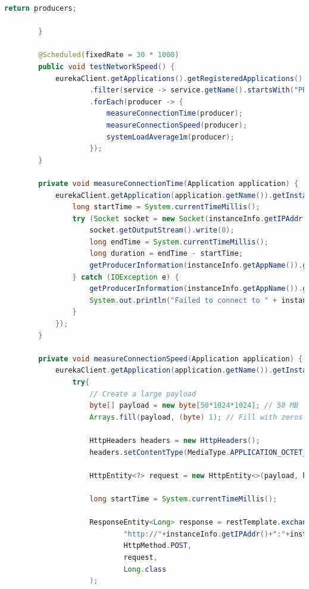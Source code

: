 \begin{lstlisting}[language=Java, caption=Kod usługi ProducerInfoService,label=ProducerInfoServiceCode]
            return producers;
    
        }
    
        @Scheduled(fixedRate = 30 * 1000)
        public void testNetworkSpeed() {
            eurekaClient.getApplications().getRegisteredApplications().stream()
                    .filter(service -> service.getName().startsWith("PRODUCER-"))
                    .forEach(producer -> {
                        measureConnectionTime(producer);
                        measureConnectionSpeed(producer);
                        systemLoadAverage1m(producer);
                    });
        }
    
        private void measureConnectionTime(Application application) {
            eurekaClient.getApplication(application.getName()).getInstances().forEach(instanceInfo -> {
                long startTime = System.currentTimeMillis();
                try (Socket socket = new Socket(instanceInfo.getIPAddr(), instanceInfo.getPort())) {
                    socket.getOutputStream().write(0);
                    long endTime = System.currentTimeMillis();
                    long duration = endTime - startTime;
                    getProducerInformation(instanceInfo.getAppName()).getMeasurementBufferConnectionTime().addMeasurement(duration+1);
                } catch (IOException e) {
                    getProducerInformation(instanceInfo.getAppName()).getMeasurementBufferConnectionTime().addMeasurement(Double.MAX_VALUE);
                    System.out.println("Failed to connect to " + instanceInfo.getIPAddr() + ":" + instanceInfo.getPort() + "->  " + e.getMessage());
                }
            });
        }
    
        private void measureConnectionSpeed(Application application) {
            eurekaClient.getApplication(application.getName()).getInstances().forEach(instanceInfo -> {
                try{
                    // Create a large payload
                    byte[] payload = new byte[50*1024*1024]; // 50 MB
                    Arrays.fill(payload, (byte) 1); // Fill with zeros
    
                    HttpHeaders headers = new HttpHeaders();
                    headers.setContentType(MediaType.APPLICATION_OCTET_STREAM);
    
                    HttpEntity<?> request = new HttpEntity<>(payload, headers);
    
                    long startTime = System.currentTimeMillis();
    
                    ResponseEntity<Long> response = restTemplate.exchange(
                            "http://"+instanceInfo.getIPAddr()+":"+instanceInfo.getPort()+"/connectionSpeed",
                            HttpMethod.POST,
                            request,
                            Long.class
                    );
    

\end{lstlisting}
